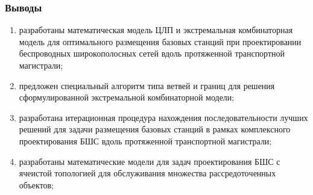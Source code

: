 \begin{frame}
    \frametitle{Выводы}
    
    \begin{enumerate}
        \item разработаны математическая модель ЦЛП и экстремальная комбинаторная модель для оптимального размещения базовых станций при
        проектировании беспроводных широкополосных сетей вдоль протяженной транспортной магистрали;
        \item предложен специальный алгоритм типа ветвей и границ для решения сформулированной экстремальной комбинаторной модели;
        \item разработана итерационная процедура нахождения последовательности лучших
        решений для задачи размещения базовых станций в рамках комплексного
        проектирования БШС вдоль протяженной транспортной магистрали;
        \item разработаны математические модели для задач проектирования БШС с ячеистой
        топологией для обслуживания множества рассредото­ченных объектов;
    \end{enumerate}
\end{frame}

